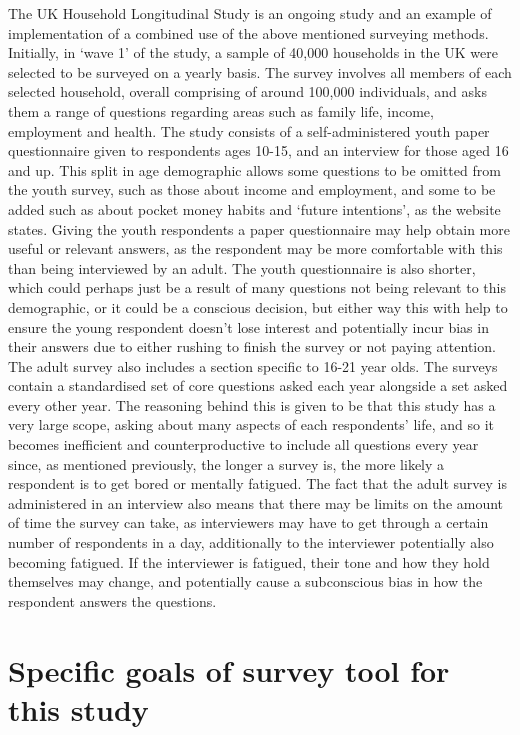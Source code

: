 \documentclass[
  12pt,
  twocolumn]{book}
\begin{document}
The UK Household Longitudinal Study \citep{longitudinal} is an ongoing
study and an example of implementation of a combined use of the above
mentioned surveying methods. Initially, in `wave 1' of the study, a
sample of 40,000 households in the UK were selected to be surveyed on a
yearly basis. The survey involves all members of each selected
household, overall comprising of around 100,000 individuals, and asks
them a range of questions regarding areas such as family life, income,
employment and health. The study consists of a self-administered youth
paper questionnaire given to respondents ages 10-15, and an interview
for those aged 16 and up. This split in age demographic allows some
questions to be omitted from the youth survey, such as those about
income and employment, and some to be added such as about pocket money
habits and `future intentions', as the website states. Giving the youth
respondents a paper questionnaire may help obtain more useful or
relevant answers, as the respondent may be more comfortable with this
than being interviewed by an adult. The youth questionnaire is also
shorter, which could perhaps just be a result of many questions not
being relevant to this demographic, or it could be a conscious decision,
but either way this with help to ensure the young respondent doesn't
lose interest and potentially incur bias in their answers due to either
rushing to finish the survey or not paying attention. The adult survey
also includes a section specific to 16-21 year olds. The surveys contain
a standardised set of core questions asked each year alongside a set
asked every other year. The reasoning behind this is given to be that
this study has a very large scope, asking about many aspects of each
respondents' life, and so it becomes inefficient and counterproductive
to include all questions every year since, as mentioned previously, the
longer a survey is, the more likely a respondent is to get bored or
mentally fatigued. The fact that the adult survey is administered in an
interview also means that there may be limits on the amount of time the
survey can take, as interviewers may have to get through a certain
number of respondents in a day, additionally to the interviewer
potentially also becoming fatigued. If the interviewer is fatigued,
their tone and how they hold themselves may change, and potentially
cause a subconscious bias in how the respondent answers the questions.

\section{Specific goals of survey tool for this study}
\end{document}
